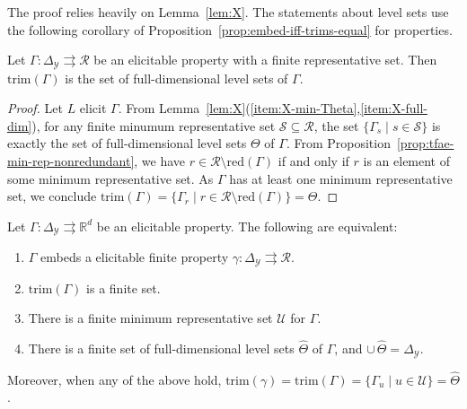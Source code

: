 \documentclass[twoside,11pt]{article}
\newcommand{\Comments}{1}
\newcommand{\mytodo}[2]{\ifnum\Comments=1%
  \todo[linecolor=#1!80!black,backgroundcolor=#1,bordercolor=#1!80!black]{#2}\fi}
\newcommand{\raft}[1]{\mytodo{green!20!white}{RF: #1}}
\newcommand{\jessiet}[1]{\mytodo{teal!20!white}{JF: #1}}
\newcommand{\reals}{\mathbb{R}}
\newcommand{\simplex}{\Delta_\Y}
\newcommand{\R}{\mathcal{R}}
\newcommand{\Sc}{\mathcal{S}}
\newcommand{\U}{\mathcal{U}}
\newcommand{\Y}{\mathcal{Y}}
\newcommand{\toto}{\rightrightarrows}
\newcommand{\red}{\mathrm{red}}
\newcommand{\trimred}{\mathrm{trim}}
\begin{document}
The proof relies heavily on Lemma~\ref{lem:X}.
The statements about level sets use the following corollary of Proposition~\ref{prop:embed-iff-trims-equal} for properties.
\begin{corollary}\label{cor:trim-prop-red}
  Let $\Gamma : \simplex \toto \R$ be an elicitable property with a finite representative set.
  Then $\trimred(\Gamma)$ is the set of full-dimensional level sets of $\Gamma$.
\end{corollary}
\begin{proof}
  Let $L$ elicit $\Gamma$.
  From Lemma~\ref{lem:X}(\ref{item:X-min-Theta},\ref{item:X-full-dim}), for any finite minumum representative set $\Sc\subseteq\R$, the set $\{\Gamma_s\mid s\in\Sc\}$ is exactly the set of full-dimensional level sets $\Theta$ of $\Gamma$.
  From Proposition~\ref{prop:tfae-min-rep-nonredundant}, we have $r \in \R\setminus \red(\Gamma)$ if and only if $r$ is an element of some minimum representative set.
  As $\Gamma$ has at least one minimum representative set, we conclude $\trimred(\Gamma) = \{\Gamma_r \mid r\in \R\setminus\red(\Gamma)\} = \Theta$.  
\end{proof}

\begin{proposition}\label{prop:embed-trim}
  Let $\Gamma:\simplex\toto\reals^d$ be an elicitable property.
  The following are equivalent:
  \begin{enumerate}\setlength{\itemsep}{0pt}
  \item $\Gamma$ embeds a elicitable finite property $\gamma:\simplex \toto \R$.
  \item $\trimred(\Gamma)$ is a finite set.%
  \item There is a finite minimum representative set $\U$ for $\Gamma$.
  \item There is a finite set of full-dimensional level sets $\hat\Theta$ of $\Gamma$, and $\cup\,\hat\Theta = \simplex$.
  \end{enumerate}
  Moreover, when any of the above hold, $\trimred(\gamma) = \trimred(\Gamma) = \{\Gamma_u \mid u\in\U\} = \hat\Theta$.
\end{proposition}
\end{document}
